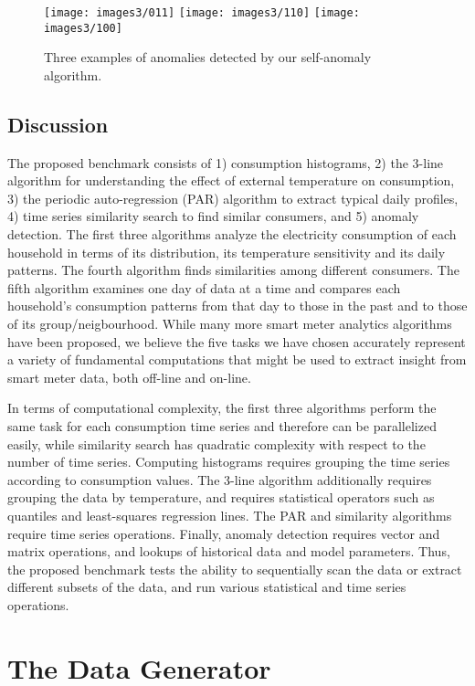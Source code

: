 \documentclass[prodmode,acmtods]{acmsmall}
\begin{document}
\begin{figure*}
\centering
\texttt{[image: images3/011]}
\texttt{[image: images3/110]}
\texttt{[image: images3/100]}
\caption{Three examples of anomalies detected by our self-anomaly algorithm.}
\label{fig:anomaly_examples}
\end{figure*}
  

\subsection{Discussion}

The proposed benchmark consists of 1) consumption histograms, 2) the 3-line algorithm for understanding the effect of external temperature on consumption, 3) the periodic auto-regression (PAR) algorithm to extract typical daily profiles, 4) time series similarity search to find similar consumers, and 5) anomaly detection.  The first three algorithms analyze the electricity consumption of each household in terms of its distribution, its temperature sensitivity and its daily patterns.  The fourth algorithm finds similarities among different consumers.  The fifth algorithm examines one day of data at a time and compares each household's consumption patterns from that day to those in the past and to those of its group/neigbourhood.  While many more smart meter analytics algorithms have been proposed, we believe the five tasks we have chosen accurately represent a variety of fundamental computations that might be used to extract insight from smart meter data, both off-line and on-line.

In terms of computational complexity, the first three algorithms perform the same task for each consumption time series and therefore can be parallelized easily, while similarity search has quadratic complexity with respect to the number of time series.  Computing histograms requires grouping the time series according to consumption values.  The 3-line algorithm additionally requires grouping the data by temperature, and requires statistical operators such as quantiles and least-squares regression lines.  The PAR and similarity algorithms require time series operations.  Finally, anomaly detection requires vector and matrix operations, and lookups of historical data and model parameters.  Thus, the proposed benchmark tests the ability to sequentially scan the data or extract different subsets of the data, and run various statistical and time series operations.


\section{The Data Generator}
\label{sec:datagen}
\end{document}
